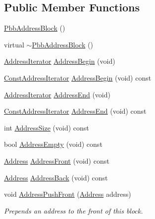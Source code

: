 \subsection*{Public Member Functions}
\begin{DoxyCompactItemize}
\item 
\hyperlink{classns3_1_1PbbAddressBlock_a7ecee39893f9f9c858451280ff4ce4aa}{Pbb\+Address\+Block} ()
\item 
virtual \hyperlink{classns3_1_1PbbAddressBlock_ac125c89afa542285a933f791dc2c8fe2}{$\sim$\+Pbb\+Address\+Block} ()
\item 
\hyperlink{classns3_1_1PbbAddressBlock_a17f626a1684a378dae2bdf678b042e37}{Address\+Iterator} \hyperlink{classns3_1_1PbbAddressBlock_a3eb4e97961cf32ffc66692ed2e9e8774}{Address\+Begin} (void)
\item 
\hyperlink{classns3_1_1PbbAddressBlock_ac1f10df8f85c0c8d4b729352bc32a7cf}{Const\+Address\+Iterator} \hyperlink{classns3_1_1PbbAddressBlock_a06fc7b5aec51633ba10b13663a63b652}{Address\+Begin} (void) const 
\item 
\hyperlink{classns3_1_1PbbAddressBlock_a17f626a1684a378dae2bdf678b042e37}{Address\+Iterator} \hyperlink{classns3_1_1PbbAddressBlock_acf5ebced174e6605bff8cb3a439a81ae}{Address\+End} (void)
\item 
\hyperlink{classns3_1_1PbbAddressBlock_ac1f10df8f85c0c8d4b729352bc32a7cf}{Const\+Address\+Iterator} \hyperlink{classns3_1_1PbbAddressBlock_a456123904d9379f58f72e1958e6fa724}{Address\+End} (void) const 
\item 
int \hyperlink{classns3_1_1PbbAddressBlock_a12f52e94b2f4197b1bc676b8d291a46e}{Address\+Size} (void) const 
\item 
bool \hyperlink{classns3_1_1PbbAddressBlock_a093b5b6f722bb35718fd95d6280ccd52}{Address\+Empty} (void) const 
\item 
\hyperlink{classns3_1_1Address}{Address} \hyperlink{classns3_1_1PbbAddressBlock_a3eb122d785142d05c6a4d67cb2387e49}{Address\+Front} (void) const 
\item 
\hyperlink{classns3_1_1Address}{Address} \hyperlink{classns3_1_1PbbAddressBlock_ad6cd39e04251acbe91b812b11f6e50bb}{Address\+Back} (void) const 
\item 
void \hyperlink{classns3_1_1PbbAddressBlock_ad3be0a944986a613e26cdf2376d2b027}{Address\+Push\+Front} (\hyperlink{classns3_1_1Address}{Address} address)
\begin{DoxyCompactList}\small\item\em Prepends an address to the front of this block. \end{DoxyCompactList}\item 

\end{DoxyCompactItemize}
